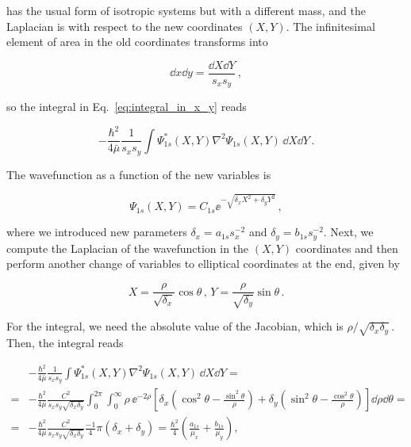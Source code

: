 \noindent has the usual form of isotropic systems but with a different mass, and the Laplacian is with respect to the new coordinates $(X,Y)$.
The infinitesimal element of area in the old coordinates transforms into

\begin{equation}
\dd x \dd y=\frac{\dd X \dd Y}{s_{x}s_{y}}\,,
\end{equation}

\noindent so the integral in Eq.~\eqref{eq:integral_in_x_y} reads

\begin{equation}
-\frac{\hbar^{2}}{4\bar{\mu}}\frac{1}{s_{x}s_{y}}\int \Psi_{1s}^{*}(X,Y)\nabla^{2}\Psi_{1s}(X,Y)\, \dd X \dd Y\,.
\end{equation}

\noindent The wavefunction as a function of the new variables is

\begin{equation}
    \Psi_{1s}(X,Y)=C_{1s}\ee^{-\sqrt{\delta_{x}X^{2}+\delta_{y}Y^{2}}}\,,
\end{equation}

\noindent where we introduced new parameters $\delta_{x}=a_{1s}s_{x}^{-2}$ and $\delta_{y}=b_{1s}s_{y}^{-2}$.
Next, we compute the Laplacian of the wavefunction in the $(X,Y)$ coordinates and then perform another change of variables to elliptical coordinates at the end, given by

\begin{equation}
    \label{eq:change_of_variables_elliptic}
    X=\frac{\rho}{\sqrt{\delta_{x}}}\cos\theta\,, \,Y=\frac{\rho}{\sqrt{\delta_{y}}}\sin\theta\,.
\end{equation}

\noindent For the integral, we need the absolute value of the Jacobian, which is $\rho/\sqrt{\delta_{x}\delta_{y}}$\,.
Then, the integral reads

\begin{equation}
    \begin{aligned}
        & -\frac{\hbar^{2}}{4\bar{\mu}}\frac{1}{s_{x}s_{y}}\int \Psi_{1s}^{*}(X,Y)\nabla^{2}\Psi_{1s}(X,Y)\, \dd X \dd Y = \\
       =& -\frac{\hbar^{2}}{4\bar{\mu}}\frac{C^{2}}{s_x s_y\sqrt{\delta_{x}\delta_{y}}}\int_{0}^{2\pi}\int_{0}^{\infty} \rho\, \ee^{-2\rho}\left[\delta_{x}\left(\cos^{2}\theta-\frac{\sin^{2}\theta}{\rho}\right)+\delta_{y}\left(\sin^{2}\theta-\frac{\cos^{2}\theta}{\rho}\right)\right] \dd \rho \dd\theta =\\
       =& -\frac{\hbar^{2}}{4\bar{\mu}}\frac{C^{2}}{s_x s_y\sqrt{\delta_{x}\delta_{y}}}\frac{-1}{4}\pi\left(\delta_{x}+\delta_{y}\right)=\frac{\hbar^{2}}{4}\!\left(\frac{a_{1s}}{\mu_{x}}+\frac{b_{1s}}{\mu_{y}}\right),
    \end{aligned}
\end{equation}

